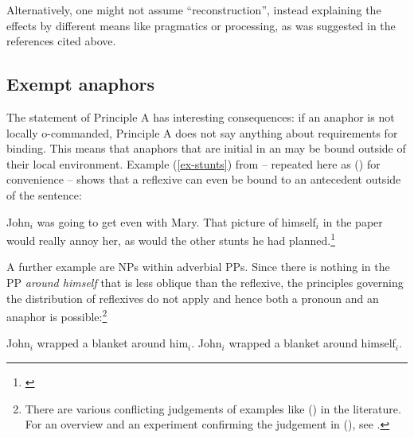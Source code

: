 \documentclass[output=paper,biblatex,babelshorthands,newtxmath,draftmode,colorlinks,citecolor=brown]{langscibook}
\begin{document}
{Alternatively, one might not assume ``reconstruction'', instead explaining the effects by different means
like pragmatics or processing, as was suggested in the references cited above.
}

\subsection{Exempt anaphors}
\label{sec-excempt-anaphors}\label{binding:sec-excempt-anaphors}


The statement of Principle A has interesting consequences: if an anaphor is not locally o-commanded,
Principle A does not say anything about requirements for binding. This means that anaphors that are
initial in an \argstl may be bound outside of their local environment. Example (\ref{ex-stunts}) from
\citet[]{ps2} -- repeated here as () for convenience -- shows that a reflexive can even be bound to an antecedent outside of the sentence:

\eanoraggedright
John$_i$ was going to get even with Mary. That picture of himself$_i$
in the paper would really annoy her, as would the other stunts he had planned.\footnote{
        \citet[]{ps2}
}
\z

\noindent
A further example are NPs within adverbial PPs. Since there is nothing in the PP \emph{around
  himself} that is less oblique than the reflexive, the principles governing the distribution of
reflexives do not apply and hence both a pronoun and an anaphor is possible:\footnote{
  There are various conflicting judgements of examples like () in the literature. For an
  overview and an experiment confirming the judgement in (), see .
}

\eal
\label{ex-john-wrapped-a-blanket-around-him}
\ex John$_i$ wrapped a blanket around him$_i$.
\ex John$_i$ wrapped a blanket around himself$_i$.
\zl
{}
\end{document}

